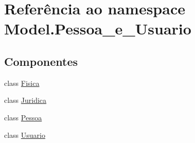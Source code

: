 \hypertarget{namespace_model_1_1_pessoa__e___usuario}{}\section{Referência ao namespace Model.\+Pessoa\+\_\+e\+\_\+\+Usuario}
\label{namespace_model_1_1_pessoa__e___usuario}
\subsection*{Componentes}
\begin{DoxyCompactItemize}
\item 
class \hyperlink{class_model_1_1_pessoa__e___usuario_1_1_fisica}{Fisica}
\item 
class \hyperlink{class_model_1_1_pessoa__e___usuario_1_1_juridica}{Juridica}
\item 
class \hyperlink{class_model_1_1_pessoa__e___usuario_1_1_pessoa}{Pessoa}
\item 
class \hyperlink{class_model_1_1_pessoa__e___usuario_1_1_usuario}{Usuario}
\end{DoxyCompactItemize}
